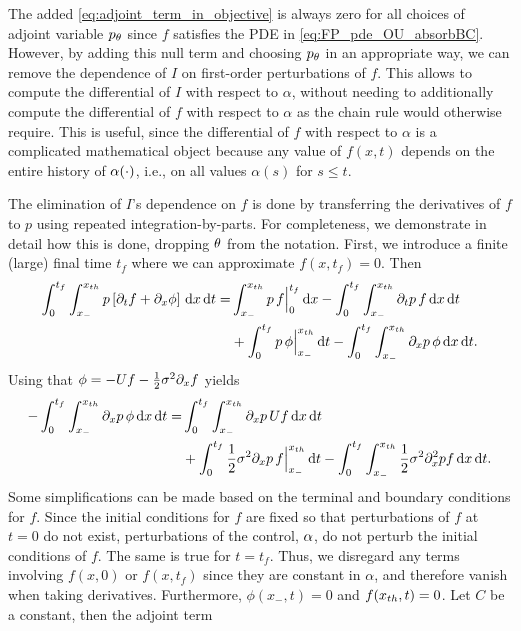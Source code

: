 \documentclass{article}
\def \tf {{t_f}}
\begin{document}
The added \cref{eq:adjoint_term_in_objective} is always zero for all
choices of adjoint variable $p_{\theta}$ 
since $f$ satisfies the PDE in \cref{eq:FP_pde_OU_absorbBC}. However,
by adding this null term and choosing $p_{\theta}$ in an appropriate way,
we can
remove the dependence of $I$ on first-order perturbations of $f$. This allows to
compute the differential of $I$ with respect to $\alpha$, without needing to
additionally compute the differential of $f$ with respect to $\alpha$ as the
chain rule would otherwise require. This is useful, since the
differential of $f$ with respect to $\alpha$ is a complicated mathematical
object because any value of $f(x,t)$ depends on the entire history of
${\alpha}(\cdot)$, i.e., on all values $\alpha(s)$ for $s\leq t$.

The elimination of $I$'s dependence on $f$ is done by transferring the
derivatives of $f$ to $p$ using repeated integration-by-parts. For completeness,
we demonstrate in detail how this is done, dropping ${\theta}$ from the
notation. First, we introduce a finite (large) final time $\tf$
where we can approximate $f(x,\tf)=0$. Then
\begin{align*}
\int_0^{\tf} \int_{x_-}^{\xth}
p  \left[\di_t f  + \di_x \phi\right]
	\intd{x}\intd{t} 
=& 
\int_{x_-}^{\xth} p \, f \Big|_0^{\tf} \intd{x} -
\int_0^{\tf}\int_{x_-}^{\xth} \di_tp \,  f \intd{x}\intd{t}  
\\
&+ \int_{0}^{\tf} p\, \phi   \Big|_{x_-}^{\xth} \intd{t}
-  \int_0^{\tf}\int_{x_-}^{\xth} \di_xp \,  \phi
\intd{x}\intd{t}.
\end{align*}
Using that $\phi = -Uf-\frac12 \sigma^2 {\partial}_xf$ yields
\begin{align*}
-  \int_0^{\tf}\int_{x_-}^{\xth} \di_xp \,  \phi
\intd{x}\intd{t}
=&
 \int_0^{\tf}\int_{x_-}^{\xth} \di_xp \,  U f\intd{x}\intd{t}
\\
&+  
\int_{0}^{\tf} \frac{1 }{2}\s^2\di_xp\, f \Big|_{x_-}^{\xth} \intd{t} -
\int_0^{\tf}\int_{x_-}^{\xth} \frac{1 }{2}\s^2\di^2_xp   f\intd{x}\intd{t}.
\end{align*}
Some simplifications can be made based on the terminal and boundary
conditions for $f$. Since the initial conditions for $f$ are fixed so that perturbations of
  $f$ at $t=0$ do not exist, perturbations of the  control, ${\alpha}$,
  do not perturb the initial conditions of $f$. The same is true for $t=\tf$. Thus, we disregard any
  terms involving $f(x,0)$ or $f(x,\tf)$ since they are constant in
  $\alpha$, and therefore vanish when taking derivatives. Furthermore, $\phi(x_-, t)=0$ and
  $f({ x_{th} }, t) = 0$. Let $C$ be a constant, then the adjoint term
\end{document}
